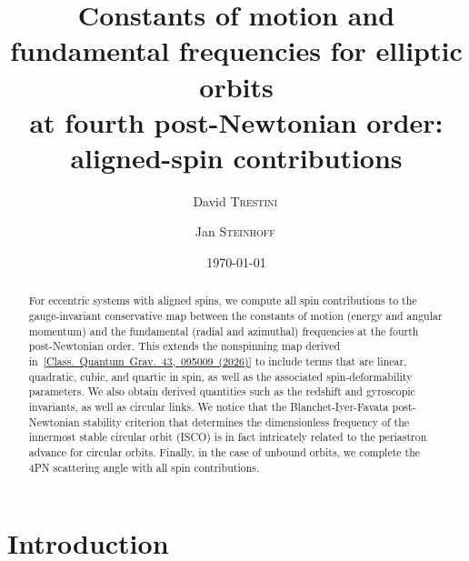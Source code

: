 \documentclass[prd,superscriptaddress,preprintnumbers,tightenlines,nofootinbib, eqsecnum]{revtex4-2}
\begin{document}
\title{Constants of motion and fundamental frequencies for elliptic orbits \\ at fourth post-Newtonian order: aligned-spin contributions}


\author{David \textsc{Trestini}\,}


\author{Jan \textsc{Steinhoff}\,}


\date{\today}

\begin{abstract}
For eccentric systems with aligned spins, we compute all spin contributions to the gauge-invariant conservative map between the constants of motion (energy and angular momentum) and the fundamental (radial and azimuthal) frequencies at the fourth post-Newtonian order. This extends the nonspinning map derived in~\mbox{\href{https://doi.org/10.1088/1361-6382/ae60dc}{[Class. Quantum Grav. 43, 095009 (2026)]}} to include terms that are linear, quadratic, cubic, and quartic in spin, as well as the associated spin-deformability parameters. We also obtain derived quantities such as the redshift and gyroscopic invariants, as well as circular links. We notice that the Blanchet-Iyer-Favata  
post-Newtonian stability criterion that determines the dimensionless frequency of the innermost stable circular orbit (ISCO) is in fact intricately related to the periastron advance for circular orbits. Finally, in the case of unbound orbits, we complete the 4PN scattering angle with all spin contributions. 
\end{abstract}


\maketitle
%
\tableofcontents

\section{Introduction}
\label{sec:intro}
 
\end{document}
